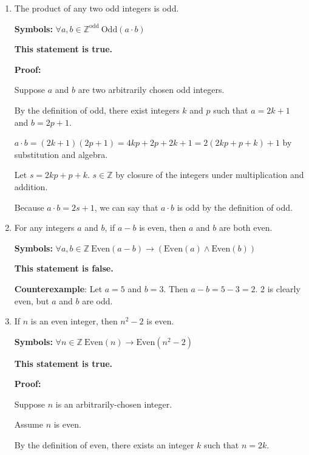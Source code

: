 \documentclass[12pt, letterpaper]{report}
\newcommand{\Z}{\mathbb{Z}}
\begin{document}
\begin{enumerate}

        \item The product of any two odd integers is odd.  %
        
        
        \textbf{Symbols:} $\forall a, b \in \Z^{\text{odd}} \ \text{Odd}(a\cdot b)$
        
        \textbf{This statement is true.}
        
        \textbf{Proof:}
        
        Suppose $a$ and $b$ are two arbitrarily chosen odd integers.
        
        By the definition of odd, there exist integers $k$ and $p$ such that $a=2k+1$ and $b=2p+1$.
        
        $a \cdot b = (2k+1)(2p+1) = 4kp + 2p + 2k + 1 = 2(2kp + p + k) + 1$ by substitution and algebra.
        
        Let $s = 2kp + p + k$.  $s \in \Z$ by closure of the integers under multiplication and addition.
        
        Because $a\cdot b = 2s+1$, we can say that $a\cdot b$ is odd by the definition of odd.
        

        
        \item For any integers $a$ and $b$, if $a-b$ is even, then $a$ and $b$ are both even.
        
        \textbf{Symbols:} $\forall a,b \in \Z \ \text{Even}(a-b) \to (\text{Even}(a)\land \text{Even}(b))$
 
        
        \textbf{This statement is false.}
        
        \textbf{Counterexample}: Let $a=5$ and $b=3$.  Then $a-b=5-3=2$.  2 is clearly even, but $a$ and $b$ are odd.
        
        \item If $n$ is an even integer, then $n^2-2$ is even.  %
        
        \textbf{Symbols:} $\forall n \in \Z \ \text{Even}(n) \to \text{Even}(n^2-2)$
        
        \textbf{This statement is true.}
        
        \textbf{Proof:}
        
        Suppose $n$ is an arbitrarily-chosen integer.  
        
        Assume $n$ is even.
        
        By the definition of even, there exists an integer $k$ such that $n=2k$.
        

\end{enumerate}
\end{document}
